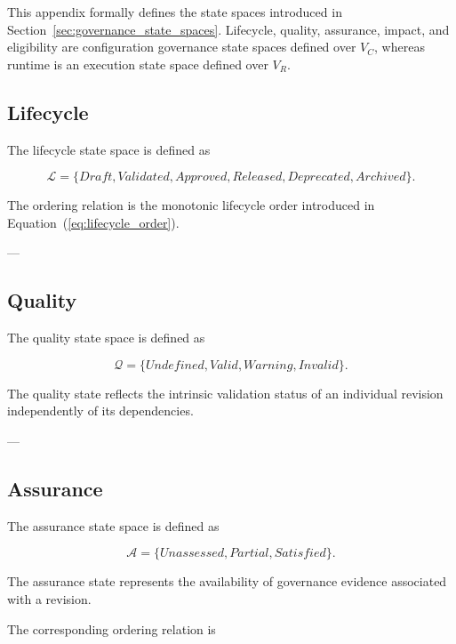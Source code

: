 \documentclass[10pt]{article}
\begin{document}
This appendix formally defines the state spaces introduced in
Section~\ref{sec:governance_state_spaces}. Lifecycle, quality, assurance, impact, and eligibility are configuration governance state spaces defined over $V_C$, whereas runtime is an execution state space defined over $V_R$.

\subsection{Lifecycle}

The lifecycle state space is defined as

\begin{equation}
	\mathcal{L}=
	\{
	Draft,
	Validated,
	Approved,
	Released,
	Deprecated,
	Archived
	\}.
	\label{eq:lifecycle_space}
\end{equation}

The ordering relation is the monotonic lifecycle order introduced in Equation~(\ref{eq:lifecycle_order}).

---

\subsection{Quality}

The quality state space is defined as

\begin{equation}
	\mathcal{Q}=
	\{
	Undefined,
	Valid,
	Warning,
	Invalid
	\}.
	\label{eq:quality_space}
\end{equation}

The quality state reflects the intrinsic validation status of an individual revision independently of its dependencies.

---

\subsection{Assurance}

The assurance state space is defined as

\begin{equation}
	\mathcal{A}=
	\{
	Unassessed,
	Partial,
	Satisfied
	\}.
	\label{eq:assurance_space}
\end{equation}

The assurance state represents the availability of governance evidence associated with a revision.

The corresponding ordering relation is
\end{document}
